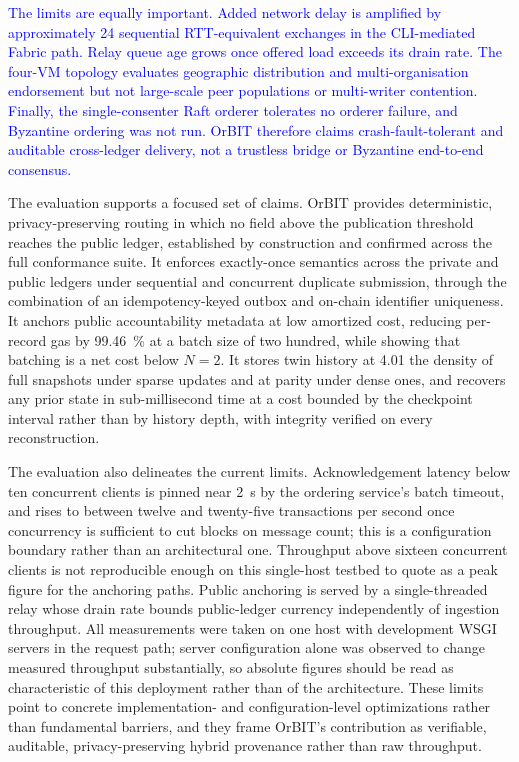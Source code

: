 \documentclass[final,5p,times,twocolumn]{elsarticle}
\begin{document}
\textcolor{blue}{The limits are equally important. Added network delay is amplified by approximately 24 sequential RTT-equivalent exchanges in the CLI-mediated Fabric path. Relay queue age grows once offered load exceeds its drain rate. The four-VM topology evaluates geographic distribution and multi-organisation endorsement but not large-scale peer populations or multi-writer contention. Finally, the single-consenter Raft orderer tolerates no orderer failure, and Byzantine ordering was not run. OrBIT therefore claims crash-fault-tolerant and auditable cross-ledger delivery, not a trustless bridge or Byzantine end-to-end consensus.}

\iffalse

The evaluation supports a focused set of claims. OrBIT provides deterministic,
privacy-preserving routing in which no field above the publication threshold
reaches the public ledger, established by construction and confirmed across the
full conformance suite. It enforces exactly-once semantics across the private
and public ledgers under sequential and concurrent duplicate submission, through
the combination of an idempotency-keyed outbox and on-chain identifier
uniqueness. It anchors public accountability metadata at low amortized cost,
reducing per-record gas by \SI{99.46}{\percent} at a batch size of two hundred,
while showing that batching is a net cost below $N=2$. It stores twin history at
\SI{4.01}{\times} the density of full snapshots under sparse updates and at
parity under dense ones, and recovers any prior state in sub-millisecond time at
a cost bounded by the checkpoint interval rather than by history depth, with
integrity verified on every reconstruction.

The evaluation also delineates the current limits. Acknowledgement latency below
ten concurrent clients is pinned near \SI{2}{\second} by the ordering service's
batch timeout, and rises to between twelve and twenty-five transactions per
second once concurrency is sufficient to cut blocks on message count; this is a
configuration boundary rather than an architectural one. Throughput above
sixteen concurrent clients is not reproducible enough on this single-host
testbed to quote as a peak figure for the anchoring paths. Public anchoring is
served by a single-threaded relay whose drain rate bounds public-ledger currency
independently of ingestion throughput. All measurements were taken on one host
with development WSGI servers in the request path; server configuration alone
was observed to change measured throughput substantially, so absolute figures
should be read as characteristic of this deployment rather than of the
architecture. These limits point to concrete implementation- and
configuration-level optimizations rather than fundamental barriers, and they
frame OrBIT's contribution as verifiable, auditable, privacy-preserving hybrid
provenance rather than raw throughput.
\end{document}

